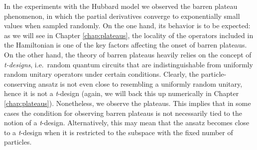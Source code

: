 In the experiments with the Hubbard model we observed the barren plateau phenomenon, in which the partial derivatives converge to exponentially small values when sampled randomly. On the one hand, its behavior is to be expected: as we will see in Chapter \ref{chap:plateaus}, the locality of the operators included in the Hamiltonian is one of the key factors affecting the onset of barren plateaus. On the other hand, the theory of barren plateaus heavily relies on the concept of \textit{t-designs}, i.e.~random quantum circuits that are indistinguishable from uniformly random unitary operators under certain conditions. Clearly, the particle-conserving ansatz is not even close to resembling a uniformly random unitary, hence it is not a \textit{t}-design (again, we will back this up numerically in Chapter \ref{chap:plateaus}). Nonetheless, we observe the plateaus. This implies that in some cases the condition for observing barren plateaus is not necessarily tied to the notion of a \textit{t}-design. Alternatively, this may mean that the ansatz becomes close to a \textit{t}-design when it is restricted to the subspace with the fixed number of particles. 






